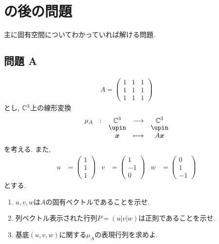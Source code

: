 \section{の後の問題}
主に固有空間についてわかっていれば解ける問題.
\subsection{問題 A}
\begin{quiz}
  \begin{align*}
    A=
    \begin{pmatrix}
      1&1&1\\
      1&1&1\\
      1&1&1
    \end{pmatrix}
  \end{align*}
  とし, $\mathbb{C}^3$上の線形変換
  \begin{align*}
    \shazo{\mu_A}{\CC^3}{\CC^3}
    {\xx}{A\xx}
  \end{align*}
  を考える. また,
  \begin{align*}
    u&=\begin{pmatrix}1\\1\\1\end{pmatrix}&
    v&=\begin{pmatrix}1\\-1\\0\end{pmatrix}&
    w&=\begin{pmatrix}0\\1\\-1\end{pmatrix}
  \end{align*}
  とする.
  \begin{enumerate}
  \item $u,v,w$は$A$の固有ベクトルであることを示せ.
  \item 列ベクトル表示された行列$P=(u|v|w)$は正則であることを示せ.
  \item 基底$(u,v,w)$に関する$\mu_A$の表現行列を求めよ.
  \end{enumerate}
\end{quiz}

